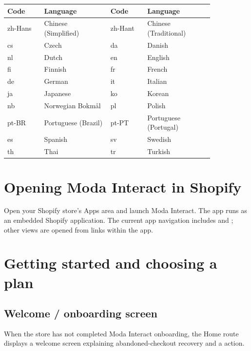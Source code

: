 \begin{longtable}{@{}P{0.15\linewidth}P{0.27\linewidth}P{0.15\linewidth}P{0.27\linewidth}@{}}
\toprule
\textbf{Code} & \textbf{Language} & \textbf{Code} & \textbf{Language}\\
\midrule
\endhead
zh-Hans & Chinese (Simplified) & zh-Hant & Chinese (Traditional)\\
cs & Czech & da & Danish\\
nl & Dutch & en & English\\
fi & Finnish & fr & French\\
de & German & it & Italian\\
ja & Japanese & ko & Korean\\
nb & Norwegian Bokm\aa l & pl & Polish\\
pt-BR & Portuguese (Brazil) & pt-PT & Portuguese (Portugal)\\
es & Spanish & sv & Swedish\\
th & Thai & tr & Turkish\\
\bottomrule
\end{longtable}


\chapter{Opening Moda Interact in Shopify}

Open your Shopify store's Apps area and launch Moda Interact. The app runs as an embedded Shopify application. The current app navigation includes  and ; other views are opened from links within the app.

\chapter{Getting started and choosing a plan}

\section{Welcome / onboarding screen}
When the store has not completed Moda Interact onboarding, the Home route displays a welcome screen explaining abandoned-checkout recovery and a  action.


